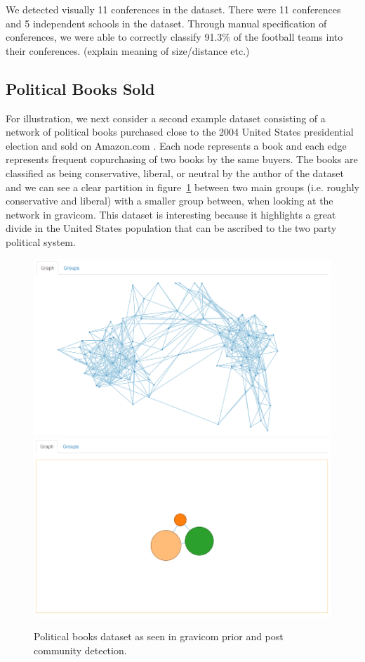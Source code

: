 \documentclass{article}\usepackage[]{graphicx}\usepackage[]{color}
\newcommand{\ak}[1]{{\color{blue} #1}}
\begin{document}
We detected visually 11 conferences in the dataset. There were 11 conferences and 5 independent schools in the dataset. Through manual specification of conferences, we were able to correctly classify 91.3\% of the football teams into their conferences. \ak{(explain meaning of size/distance etc.)}

\subsection{Political Books Sold}
For \ak{illustration}, we next consider a second example dataset consisting of a network of political books purchased close to the 2004 United States presidential election and sold on Amazon.com \cite{polbooks}. Each node represents a book and each edge represents frequent copurchasing of two books by the same buyers. The books are classified as being conservative, liberal, or neutral by the author of the dataset and we can see a clear partition in figure~\ref{fig:polbooks_1} between two main groups (i.e. roughly conservative and liberal) with a smaller group between, when looking at the network in gravicom. This dataset is interesting because it highlights a great divide in the United States population that can be ascribed to the two party political system. 

\begin{figure}[H]
\centering
\includegraphics[width=\textwidth]{images/polbooks_1.png}
\includegraphics[width=\textwidth]{images/polbooks_2.png}
\caption{\label{fig:polbooks_1} Political books dataset as seen in gravicom prior and post community detection.}
\end{figure}
\end{document}

